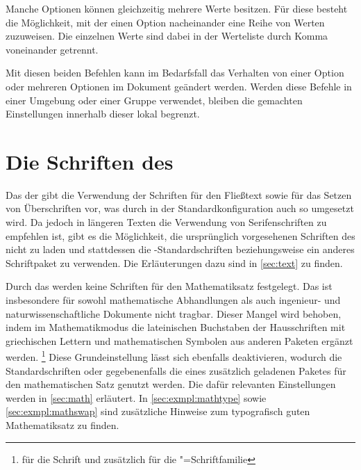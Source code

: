 \begin{Declaration*}{}
\begin{Declaration*}{}
\begin{Declaration*}{}
\begin{Declaration}{}
\begin{Declaration}{}
Manche Optionen können gleichzeitig mehrere Werte besitzen. Für diese besteht 
die Möglichkeit, mit  der einen Option nacheinander eine 
Reihe von Werten zuzuweisen. Die einzelnen Werte sind dabei in der Werteliste 
durch Komma voneinander getrennt.

Mit diesen beiden Befehlen kann im Bedarfsfall das Verhalten von einer Option 
oder mehreren Optionen im Dokument geändert werden. Werden diese Befehle in 
einer Umgebung oder einer Gruppe verwendet, bleiben die gemachten Einstellungen 
innerhalb dieser lokal begrenzt.
\end{Declaration}
\end{Declaration}



\section{Die Schriften des \CDs}
\label{sec:fonts}%
%
%
Das \CD der \TnUD gibt die Verwendung der Schriften \Univers für den Fließtext 
sowie \DIN für das Setzen von Überschriften vor, was durch \TUDScript in der 
Standardkonfiguration auch so umgesetzt wird. Da jedoch in längeren Texten die 
Verwendung von Serifenschriften zu empfehlen ist, gibt es die Möglichkeit, die 
ursprünglich vorgesehenen Schriften des \CDs nicht zu laden und stattdessen die 
-Standardschriften beziehungsweise ein anderes Schriftpaket zu 
verwenden. Die Erläuterungen dazu sind in \autoref{sec:text} zu finden.

Durch das \CD werden keine Schriften für den Mathematiksatz festgelegt. Das ist 
insbesondere für sowohl mathematische Abhandlungen als auch ingenieur- und 
naturwissenschaftliche Dokumente nicht tragbar. Dieser Mangel wird behoben, 
indem im Mathematikmodus die lateinischen Buchstaben der Hausschriften mit 
griechischen Lettern und mathematischen Symbolen aus anderen Paketen ergänzt 
werden.%
\footnote{%
   für die Schrift \DIN und zusätzlich  für 
  die \Univers"=Schriftfamilie%
}
Diese Grundeinstellung lässt sich ebenfalls deaktivieren, wodurch die 
Standardschriften oder gegebenenfalls die eines zusätzlich geladenen Paketes 
für den mathematischen Satz genutzt werden. Die dafür relevanten Einstellungen 
werden in \autoref{sec:math} erläutert. In \autoref{sec:exmpl:mathtype} sowie 
\autoref{sec:exmpl:mathswap} sind zusätzliche Hinweise zum typografisch guten 
Mathematiksatz zu finden.



\end{Declaration*}
\end{Declaration*}
\end{Declaration*}
